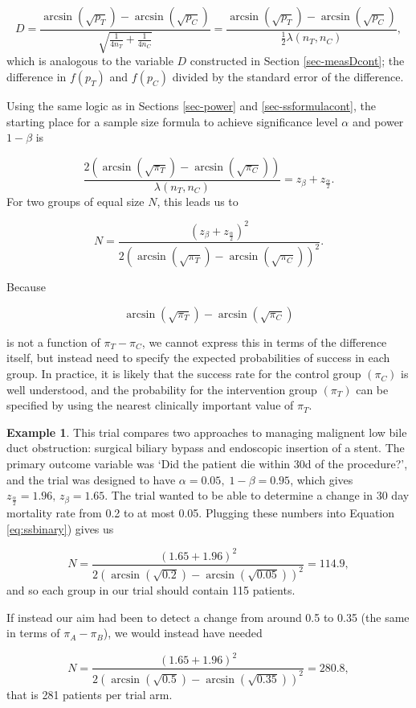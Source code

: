 \documentclass[
  openany]{book}
\theoremstyle{definition}
\theoremstyle{definition}
\newtheorem{example}{Example}[chapter]
\theoremstyle{definition}
\theoremstyle{definition}
\theoremstyle{remark}
\begin{document}
\[
D =  \frac{\arcsin{\left(\sqrt{p_T}\right)} - \arcsin{\left(\sqrt{p_C}\right)}}{\sqrt{\frac{1}{4n_T} + \frac{1}{4n_C}}}=  \frac{\arcsin{\left(\sqrt{p_T}\right)} - \arcsin{\left(\sqrt{p_C}\right)}}{\frac{1}{2}\lambda\left(n_T,n_C\right)},
\]
which is analogous to the variable \(D\) constructed in Section \ref{sec-measDcont}; the difference in \(f\left(p_T\right)\) and \(f\left(p_C\right)\) divided by the standard error of the difference.

Using the same logic as in Sections \ref{sec-power} and \ref{sec-ssformulacont}, the starting place for a sample size formula to achieve significance level \(\alpha\) and power \(1-\beta\) is

\[
\frac{2\left(\arcsin{\left(\sqrt{\pi_T}\right)} - \arcsin{\left(\sqrt{\pi_C}\right)}\right)}{\lambda\left(n_T,n_C\right)} = z_\beta + z_{\frac{\alpha}{2}}.
\]
For two groups of equal size \(N\), this leads us to

\begin{equation}
N = \frac{\left(z_\beta + z_{\frac{\alpha}{2}}\right)^2}{2\left(\arcsin{\left(\sqrt{\pi_T}\right)} - \arcsin{\left(\sqrt{\pi_C}\right)}\right)^2}.
\label{eq:ssbinary}
\end{equation}

Because

\[\arcsin{\left(\sqrt{\pi_T}\right)} - \arcsin{\left(\sqrt{\pi_C}\right)}\]

is not a function of \(\pi_T - \pi_C\), we cannot express this in terms of the difference itself, but instead need to specify the expected probabilities of success in each group. In practice, it is likely that the success rate for the control group \(\left(\pi_C\right)\) is well understood, and the probability for the intervention group \(\left(\pi_T\right)\) can be specified by using the nearest clinically important value of \(\pi_T\).

\begin{example}
\protect\hypertarget{exm:samplesize1}{}\label{exm:samplesize1}\citep[From][]{smith1994randomised}
This trial compares two approaches to managing malignent low bile duct obstruction: surgical biliary bypass and endoscopic insertion of a stent. The primary outcome variable was `Did the patient die within 30d of the procedure?', and the trial was designed to have \(\alpha=0.05,\;1-\beta=0.95\), which gives \(z_{\frac{\alpha}{2}}=1.96,\,z_{\beta} = 1.65\). The trial wanted to be able to determine a change in 30 day mortality rate from 0.2 to at most 0.05. Plugging these numbers into Equation \eqref{eq:ssbinary}) gives us

\[ N = \frac{\left(1.65 + 1.96\right)^2}{2\left(\arcsin{\left(\sqrt{0.2}\right)} - \arcsin{\left(\sqrt{0.05}\right)}\right)^2} = 114.9, \]
and so each group in our trial should contain 115 patients.

If instead our aim had been to detect a change from around 0.5 to 0.35 (the same in terms of \(\pi_A - \pi_B\)), we would instead have needed

\[ N = \frac{\left(1.65 + 1.96\right)^2}{2\left(\arcsin{\left(\sqrt{0.5}\right)} - \arcsin{\left(\sqrt{0.35}\right)}\right)^2} = 280.8 ,\]
that is 281 patients per trial arm.
\end{example}
\end{document}
